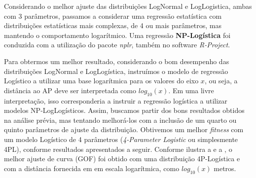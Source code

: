 \documentclass[
	12pt,				%
	twoside,			%
	a4paper,			%
	english,			%
	french,				%
	spanish,			%
	brazil				%
	]{abntex2}
\begin{document}
Considerando o melhor ajuste das distribuições LogNormal e LogLogistica,
ambas com 3 parâmetros, passamos a considerar uma regressão estatística
com distribuições estatísticas mais complexas, de 4 ou mais parâmetros,
mas mantendo o comportamento logarítmico. Uma regressão
\textbf{NP-Logística} foi conduzida com a utilização do pacote
\emph{nplr}, também no software \emph{R-Project}.

Para obtermos um melhor resultado, considerando o bom desempenho das
distribuições LogNormal e LogLogística, instruímos o modelo de regressão
Logístico a utilizar uma base logarítmica para os valores do eixo \(x\),
ou seja, a distância ao AP deve ser interpretada como \(log_{10}(x)\).
Em uma livre interpretação, isso corresponderia a instruir a regressão
logística a utilizar modelos NP-LogLogísticos. Assim, buscamos partir
dos bons resultados obtidos na análise prévia, mas tentando melhorá-los
com a inclusão de um quarto ou quinto parâmetros de ajuste da
distribuição. Obtivemos um melhor \emph{fitness} com um modelo Logístico
de 4 parâmetros (\emph{4-Parameter Logistic} ou simplesmente 4PL),
conforme resultados apresentados a seguir. Conforme ilustra a e a , o
melhor ajuste de curva (GOF) foi obtido com uma distribuição
4P-Logística e com a distância fornecida em em escala logarítmica, como
\(log_{10}(x)\) metros.
\end{document}
